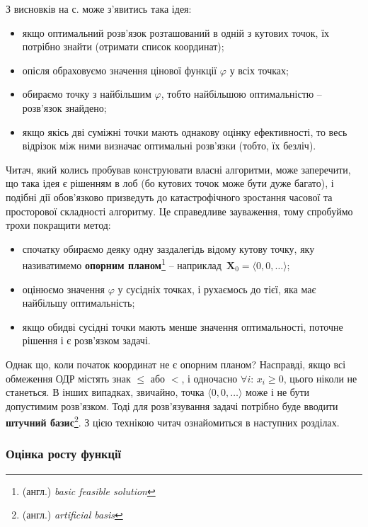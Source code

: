 \documentclass[\main/book.tex]{subfiles}
\begin{document}
З висновків на с. \pageref{conclusion:linear:optimal_solution} може з'явитись така ідея:

\begin{itemize}
 \item якщо оптимальний розв'язок розташований в одній з кутових точок, їх потрібно знайти (отримати список координат);
 \item опісля обраховуємо значення цінової функції $\varphi$ у всіх точках;
 \item обираємо точку з найбільшим $\varphi$, тобто найбільшою оптимальністю -- розв'язок знайдено;
 \item якщо якісь дві суміжні точки мають однакову оцінку ефективності, то весь відрізок між ними визначає оптимальні розв'язки (тобто, їх безліч).
\end{itemize}

Читач, який колись пробував конструювати власні алгоритми, може заперечити, що така ідея є рішенням \flqq{}в лоб\frqq{} (бо кутових точок може бути дуже багато), і подібні дії обов'язково призведуть до катастрофічного зростання часової та просторової складності алгоритму. Це справедливе зауваження, тому спробуймо трохи покращити метод:

\begin{itemize}
 \item спочатку обираємо деяку одну заздалегідь відому кутову точку, яку називатимемо \textbf{опорним планом}\footnote{(англ.) \textit{basic feasible solution}} -- наприклад~$\mathbf{X}_0 = {\langle 0, 0, \ldots \rangle}$;
 \item оцінюємо значення $\varphi$ у сусідніх точках, і рухаємось до тієї, яка має найбільшу оптимальність;
 \item якщо обидві сусідні точки мають менше значення оптимальності, поточне рішення і є розв'язком задачі.
\end{itemize}

Однак що, коли початок координат не є опорним планом? Насправді, якщо всі обмеження ОДР містять знак \flqq{}$\leq$\frqq{} або \flqq{}$<$\frqq{}, і одночасно ${\forall i:}\, {x_i \geq 0}$, цього ніколи не станеться. В інших випадках, звичайно, точка ${\langle 0, 0, \ldots \rangle}$ може і не бути допустимим розв'язком. Тоді для розв'язування задачі потрібно буде вводити \textbf{штучний базис}\footnote{(англ.) \textit{artificial basis}}. З цією технікою читач ознайомиться в наступних розділах.
\subsubsection{Оцінка росту функції}
\label{section:linear:phi_increase_evaluation}
\end{document}
